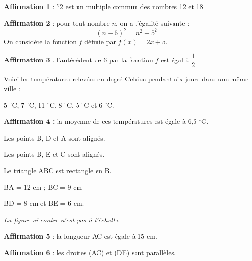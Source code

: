 \documentclass[exercice]{thedocument}%
\begin{document}
%
    {\bfseries Affirmation 1} : 72 est un multiple commun des nombres 12 et 18\medskip\par\noindent
    {\bfseries Affirmation 2} : pour tout nombre $n$, on a l'égalité suivante : $$(n-5)^2=n^2-5^2$$
    On considère la fonction $f$ définie par $f(x)=2x+5$.\medskip\par\noindent
    {\bfseries Affirmation 3} : l'antécédent de 6 par la fonction $f$ est égal à $\dfrac12$\medskip\par\noindent
    Voici les températures relevées en degré Celsius pendant six jours
    dans une même ville :\par
    5 $^\circ\text{C}$, 7 $^\circ\text{C}$, 11 $^\circ\text{C}$, 8 $^\circ\text{C}$, 5 $^\circ\text{C}$ et 6 $^\circ\text{C}$.\medskip\par\noindent
    {\bfseries Affirmation 4 :} la moyenne de ces températures est égale à 6,5 $^\circ\text{C}$.\medskip\par\noindent
    \begin{minipage}[t]{.5\linewidth}
        Les points B, D et A sont alignés.\par
        Les points B, E et C sont alignés.\par
        Le triangle ABC est rectangle en B.\par
        BA = 12 cm ; BC = 9 cm\par
        BD = 8 cm et BE = 6 cm.\par
        {\itshape La figure ci-contre n'est pas à l'échelle.}
    \end{minipage}\hskip20pt
    \medskip\par\noindent
    {\bfseries Affirmation 5} : la longueur AC est égale à 15 cm.\medskip\par\noindent
    {\bfseries Affirmation 6} : les droites (AC) et (DE) sont parallèles.
\end{document}
